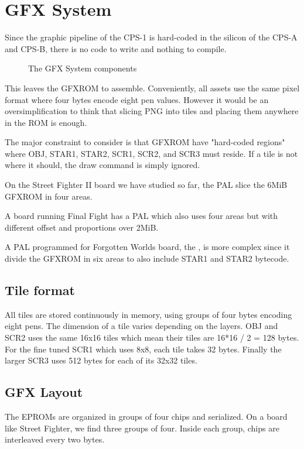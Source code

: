 \chapter{GFX System}
Since the graphic pipeline of the CPS-1 is hard-coded in the silicon of the CPS-A and CPS-B, there is no code to write and nothing to compile. 

\begin{figure}[H]
\caption*{The GFX System components}
\end{figure}

This leaves the GFXROM to assemble. Conveniently, all assets use the same pixel format where four bytes encode eight pen values. However it would be an oversimplification to think that slicing PNG into tiles and placing them anywhere in the ROM is enough.

The major constraint to consider is that GFXROM have "hard-coded regions" where OBJ, STAR1, STAR2, SCR1, SCR2, and SCR3 must reside. If a tile is not where it should, the draw command is simply ignored.

On the Street Fighter II board we have studied so far, the  PAL slice the 6MiB GFXROM in four areas. 

A board running Final Fight has a  PAL which also uses four areas but with different offset and proportions over 2MiB. 

A PAL programmed for Forgotten Worlds board, the , is more complex since it divide the GFXROM in six areas to also include STAR1 and STAR2 bytecode.


\section{Tile format}
All tiles are stored continuously in memory, using groups of four bytes encoding eight pens. The dimension of a tile varies depending on the layers. OBJ and SCR2 uses the same 16x16 tiles which mean their tiles are 16*16 / 2 = 128 bytes. For the fine tuned SCR1 which uses 8x8, each tile takes 32 bytes. Finally the larger SCR3 uses 512 bytes for each of its 32x32 tiles.

\section{GFX Layout}
The EPROMs are organized in groups of four chips and serialized. On a board like Street Fighter, we find three groups of four. Inside each group, chips are interleaved every two bytes.


